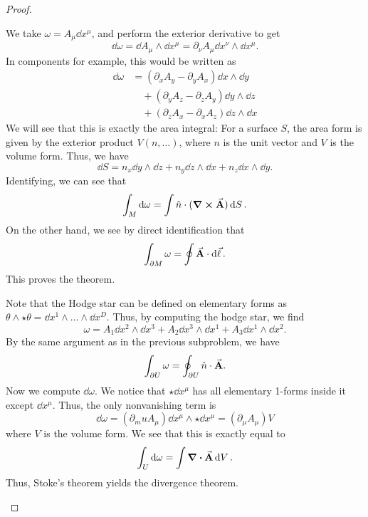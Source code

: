 \begin{proof}
	\begin{parts}
	\item We take $\omega=A_\mu\dd{x^\mu}$, and perform the exterior derivative to get
		\[
			\dd{\omega} = \dd{A_\mu}\wedge\dd{x^\mu} = \partial_\nu A_{\mu} \dd{x^\nu}\wedge\dd{x^\mu}	
		.\] 
		In components for example, this would be written as
		\begin{align*}
			\dd{\omega} &= (\partial_x A_y - \partial_y A_x) \dd{x}\wedge\dd{y} \\
				    &\quad +(\partial_y A_z - \partial_z A_y)\dd{y}\wedge\dd{z} \\
				    &\quad + (\partial_z A_x -\partial_x A_z)\dd{z}\wedge\dd{x}
		\end{align*}
		We will see that this is exactly the area integral: For a surface $S$, the area form is given by the exterior product $V(n, \dots)$, where $n$ is the unit vector and $V$ is the volume form. Thus, we have
		\[
			\dd{S} = n_x \dd{y}\wedge\dd{z}+n_y\dd{z}\wedge\dd{x}+n_z\dd{x}\wedge\dd{y}
		.\] 
		Identifying, we can see that
		\[
			\int_M \dd{\omega} = \int \hat{n}\cdot (\curl{\va A})\dd{S}
		.\] 
		On the other hand, we see by direct identification that
		\[
			\int_{\partial M}\omega = \oint \va{A}\cdot \dd{\va\ell}
		.\] 
		This proves the theorem.
	\item Note that the Hodge star can be defined on elementary forms as $\theta \wedge\star\theta = \dd{x^1}\wedge\dots\wedge\dd{x^D}$. Thus, by computing the hodge star, we find
		 \[
			 \omega = A_1\dd{x^2}\wedge\dd{x^3} + A_2\dd{x^3}\wedge\dd{x^1}+A_3\dd{x^1}\wedge\dd{x^2}
		.\] 
		By the same argument as in the previous subproblem, we have
		\[
			\int_{\partial U}\omega = \oint_{\partial U}\hat{n}\cdot\va A
		.\] 
		Now we compute $\dd{\omega}$. We notice that $\star \dd{x^\mu}$ has all elementary 1-forms inside it except $\dd{x^\mu}$. Thus, the only nonvanishing term is
		\[
			\dd{\omega} = (\partial_mu A_\mu)\dd{x^\mu}\wedge \star \dd{x^\mu} = (\partial_\mu A_\mu)V
		\] 
		where $V$ is the volume form. We see that this is exactly equal to
		\[
			\int_U \dd{\omega} = \int \div{\va A}\dd{V}
		.\] 
		Thus, Stoke's theorem yields the divergence theorem.\qedhere
	\end{parts}
\end{proof}

